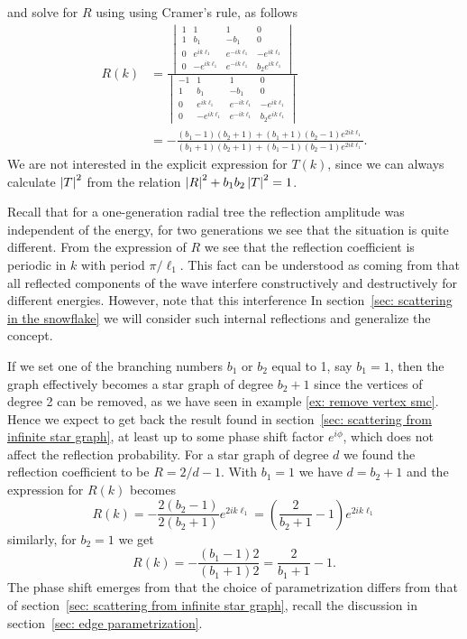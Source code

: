 and solve for $R$ using using Cramer's rule, as follows
\begin{equation}\label{eq: 2gen R}
  \begin{aligned}
    R(k) &= \frac{
      \begin{vmatrix}
        1 & 1             & 1             & 0                \\
        1 & b_1           & -b_1          & 0                \\
        0 & e^{ik\ell_1}  & e^{-ik\ell_1} & -e^{ik\ell_1}    \\
        0 & -e^{ik\ell_1} & e^{-ik\ell_1} & b_2 e^{ik\ell_1}
      \end{vmatrix}
    }{
      \begin{vmatrix}
        -1 & 1             & 1             & 0                \\
        1  & b_1           & -b_1          & 0                \\
        0  & e^{ik\ell_1}  & e^{-ik\ell_1} & -e^{ik\ell_1}    \\
        0  & -e^{ik\ell_1} & e^{-ik\ell_1} & b_2 e^{ik\ell_1}
      \end{vmatrix}
    } \\
    &= -\frac{(b_1-1) (b_2+1)+(b_1+1) (b_2-1) e^{2 i k \ell_1}}{(b_1+1) (b_2+1)+(b_1-1) (b_2-1) e^{2 i k \ell_1}}.
  \end{aligned}
\end{equation}
We are not interested in the explicit expression for $T(k)$, since we can always calculate $\left\lvert T\right\rvert^2$ from the relation $\left\lvert R\right\rvert^2 + b_1b_2\left\lvert T\right\rvert^2 = 1$.

Recall that for a one-generation radial tree the reflection amplitude was independent of the energy, for two generations we see that the situation is quite different. From the expression of $R$ we see that the reflection coefficient is periodic in $k$ with period $\pi/\ell_1$. This fact can be understood as coming from that all reflected components of the wave interfere constructively and destructively for different energies. However, note that this interference  In section~\ref{sec: scattering in the snowflake} we will consider such internal reflections and generalize the concept.

If we set one of the branching numbers $b_1$ or $b_2$ equal to 1, say $b_1=1$, then the graph effectively becomes a star graph of degree $b_2+1$ since the vertices of degree 2 can be removed, as we have seen in example \ref{ex: remove vertex smc}. Hence we expect to get back the result found in section~\ref{sec: scattering from infinite star graph}, at least up to some phase shift factor $e^{i\phi}$, which does not affect the reflection probability. For a star graph of degree $d$ we found the reflection coefficient to be $R = 2/d - 1$. With $b_1 = 1$ we have $d = b_2 + 1$ and the expression for $R(k)$ becomes
\[
  R(k) = - \frac{2(b_2-1)}{2(b_2+1)} e^{2ik\ell_1} = \left( \frac{2}{b_2+1} - 1 \right) e^{2ik\ell_1}
\]
similarly, for $b_2=1$ we get
\[
  R(k) = - \frac{(b_1-1)2}{(b_1+1)2} = \frac{2}{b_1+1} - 1.
\]
The phase shift emerges from that the choice of parametrization differs from that of section~\ref{sec: scattering from infinite star graph}, recall the discussion in section~\ref{sec: edge parametrization}.

